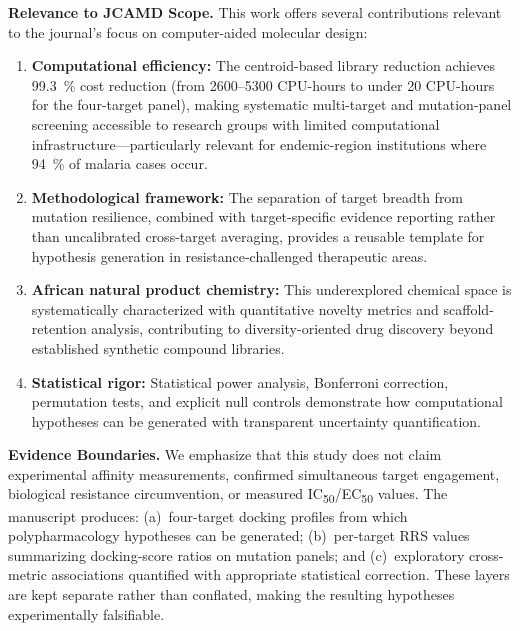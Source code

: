 \documentclass[11pt,letterpaper]{article}
\begin{document}
\vspace{0.3em}

\noindent\textbf{Relevance to JCAMD Scope.}
This work offers several contributions relevant to the journal's focus on computer-aided molecular design:

\begin{enumerate}[leftmargin=*]
\item \textbf{Computational efficiency:} The centroid-based library reduction achieves \qty{99.3}{\percent} cost reduction (from \numrange{2600}{5300} CPU-hours to under 20 CPU-hours for the four-target panel), making systematic multi-target and mutation-panel screening accessible to research groups with limited computational infrastructure---particularly relevant for endemic-region institutions where \qty{94}{\percent} of malaria cases occur.

\item \textbf{Methodological framework:} The separation of target breadth from mutation resilience, combined with target-specific evidence reporting rather than uncalibrated cross-target averaging, provides a reusable template for hypothesis generation in resistance-challenged therapeutic areas.

\item \textbf{African natural product chemistry:} This underexplored chemical space is systematically characterized with quantitative novelty metrics and scaffold-retention analysis, contributing to diversity-oriented drug discovery beyond established synthetic compound libraries.

\item \textbf{Statistical rigor:} Statistical power analysis, Bonferroni correction, permutation tests, and explicit null controls demonstrate how computational hypotheses can be generated with transparent uncertainty quantification.
\end{enumerate}

\vspace{0.3em}

\noindent\textbf{Evidence Boundaries.}
We emphasize that this study does not claim experimental affinity measurements, confirmed simultaneous target engagement, biological resistance circumvention, or measured IC\textsubscript{50}/EC\textsubscript{50} values. The manuscript produces: (a)~four-target docking profiles from which polypharmacology hypotheses can be generated; (b)~per-target RRS values summarizing docking-score ratios on mutation panels; and (c)~exploratory cross-metric associations quantified with appropriate statistical correction. These layers are kept separate rather than conflated, making the resulting hypotheses experimentally falsifiable.
\end{document}
